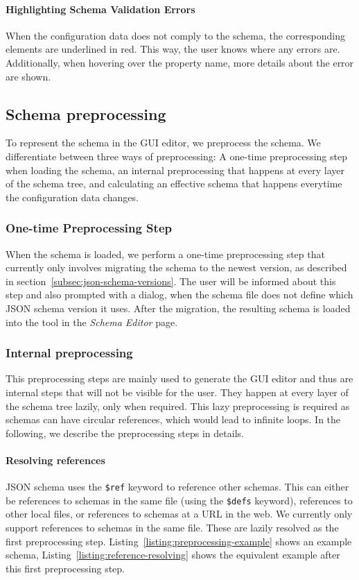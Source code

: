 \paragraph{Highlighting Schema Validation Errors}
When the configuration data does not comply to the schema, the corresponding elements are underlined in red.
This way, the user knows where any errors are.
Additionally, when hovering over the property name, more details about the error are shown.

\subsection{Schema preprocessing}\label{subsec:schema-preprocessing}

To represent the schema in the GUI editor, we preprocess the schema.
We differentiate between three ways of preprocessing:
A one-time preprocessing step when loading the schema, an internal preprocessing that happens at every layer of the schema tree,
and calculating an effective schema that happens everytime the configuration data changes.

\subsubsection{One-time Preprocessing Step}
When the schema is loaded, we perform a one-time preprocessing step that currently only involves migrating the schema to the newest version,
as described in section~\ref{subsec:json-schema-versions}.
The user will be informed about this step and also prompted with a dialog, when the schema file does not define which JSON schema version it uses.
After the migration, the resulting schema is loaded into the tool in the \textit{Schema Editor} page.


\subsubsection{Internal preprocessing}
This preprocessing steps are mainly used to generate the GUI editor and thus are internal steps that will not be visible for the user.
They happen at every layer of the schema tree lazily, only when required.
This lazy preprocessing is required as schemas can have circular references, which would lead to infinite loops.
In the following, we describe the preprocessing steps in details.

\paragraph{Resolving references}
JSON schema uses the \texttt{\$ref} keyword to reference other schemas.
This can either be references to schemas in the same file (using the \texttt{\$defs} keyword), references to other local files,
or references to schemas at a URL in the web.
We currently only support references to schemas in the same file.
These are lazily resolved as the first preprocessing step.
Listing~\ref{listing:preprocessing-example} shows an example schema, Listing~\ref{listing:reference-resolving} shows the equivalent example after
this first preprocessing step.

